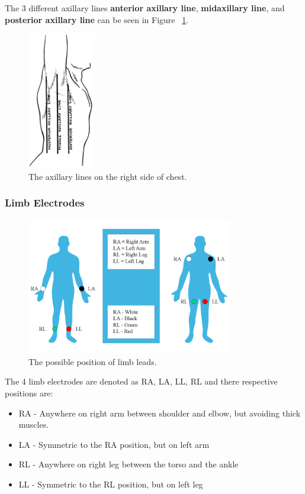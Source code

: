 The 3 different axillary lines \textbf{anterior axillary line}, \textbf{midaxillary line}, and \textbf{posterior axillary line} can be seen in Figure ~\ref{fig:axillary_lines}. 

\begin{figure}[htpb]
	\centering
	\includegraphics[width=\textwidth,height=6cm,keepaspectratio=true]{images/Brantigan_1963_1-53.png}
	\caption{
		The axillary lines on the right side of chest\cite{wiki:aux_lines}.
	}
	\label{fig:axillary_lines}
\end{figure}



\subsubsection{Limb Electrodes}

\begin{figure}[htpb]
	\centering
	\includegraphics[width=\textwidth,height=6cm,keepaspectratio=true]{images/Limb_leads}
	\caption{
		The possible position of limb leads\cite{wiki:limb_leads}.
	}
	\label{fig:limb_leads}
\end{figure}

The 4 limb electrodes are denoted as RA, LA, LL, RL and there respective positions are:

\begin{itemize}
	\item RA - Anywhere on right arm between shoulder and elbow, but avoiding thick muscles.
	\item LA - Symmetric to the RA position, but on left arm
	\item RL - Anywhere on right leg between the torso and the ankle
	\item LL - Symmetric to the RL position, but on left leg
\end{itemize} 

